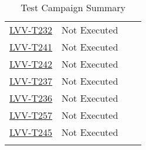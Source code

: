 \documentclass[SE,lsstdraft,STR,toc]{lsstdoc}
\begin{document}
\begin{longtable}{p{2cm}p{2.5cm}p{9cm}p{2.5cm}}
\begin{minipage}[]{9cm}
    \medskip
    \end{minipage}
    &
    \\\hline
    \href{https://jira.lsstcorp.org/secure/Tests.jspa#/testCase/LVV-T232}{LVV-T232}
    & Not Executed &
    \begin{minipage}[]{9cm}
    \smallskip
    
    \medskip
    \end{minipage}
    &
    \\\hline
    \href{https://jira.lsstcorp.org/secure/Tests.jspa#/testCase/LVV-T241}{LVV-T241}
    & Not Executed &
    \begin{minipage}[]{9cm}
    \smallskip
    
    \medskip
    \end{minipage}
    &
    \\\hline
    \href{https://jira.lsstcorp.org/secure/Tests.jspa#/testCase/LVV-T242}{LVV-T242}
    & Not Executed &
    \begin{minipage}[]{9cm}
    \smallskip
    
    \medskip
    \end{minipage}
    &
    \\\hline
    \href{https://jira.lsstcorp.org/secure/Tests.jspa#/testCase/LVV-T237}{LVV-T237}
    & Not Executed &
    \begin{minipage}[]{9cm}
    \smallskip
    
    \medskip
    \end{minipage}
    &
    \\\hline
    \href{https://jira.lsstcorp.org/secure/Tests.jspa#/testCase/LVV-T236}{LVV-T236}
    & Not Executed &
    \begin{minipage}[]{9cm}
    \smallskip
    
    \medskip
    \end{minipage}
    &
    \\\hline
    \href{https://jira.lsstcorp.org/secure/Tests.jspa#/testCase/LVV-T257}{LVV-T257}
    & Not Executed &
    \begin{minipage}[]{9cm}
    \smallskip
    
    \medskip
    \end{minipage}
    &
    \\\hline
    \href{https://jira.lsstcorp.org/secure/Tests.jspa#/testCase/LVV-T245}{LVV-T245}
    & Not Executed &
    \begin{minipage}[]{9cm}
    \smallskip
    
    \medskip
    \end{minipage}
    &
    \\\hline
\caption{Test Campaign Summary}
\label{table:summary}
\end{longtable}
\end{document}
